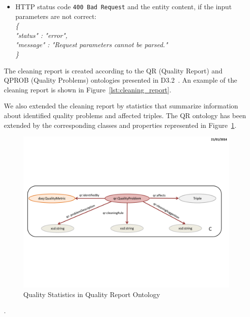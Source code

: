 \begin{description}
\begin{itemize}
\item HTTP status code \texttt{400 Bad Request} and the entity content, if the input parameters are not correct:\\ \hspace*{0.2 cm} \textit{\{} \\
\hspace*{0.5 cm} \textit{"status" : "error",}\\
\hspace*{0.5 cm}  \textit{"message" : "Request parameters cannot be parsed."}\\ \hspace*{0.2 cm} \textit{\}}

\end{itemize}
The cleaning report is created according to the QR (Quality Report) and QPROB (Quality Problems) ontologies presented in D3.2~\cite{d3.2}.
An example of the cleaning report is shown in Figure~\ref{lst:cleaning_report}.


We also extended the cleaning report by statistics that summarize information about identified quality problems and affected triples. 
The QR ontology has been extended by the corresponding classes and properties represented in Figure~\ref{fig:stat}.


\begin{figure}[ht!]
\centering
\includegraphics[page=8,trim=1.0cm 16.0cm .8cm 1.0cm,clip,width=\textwidth]{figures/CleaningFigures.pdf}
\caption{Quality Statistics in Quality Report Ontology}
\label{fig:stat}
\end{figure}
.



\end{description}
